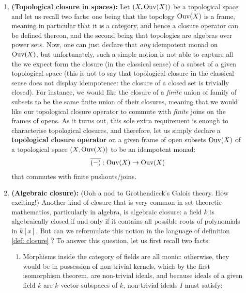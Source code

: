                     \begin{example}
                        \noindent
                        \begin{enumerate}
                            \item \textbf{(Topological closure in spaces):} Let $(X, \mathrm{Ouv}(X))$ be a topological space and let us recall two facts: one being that the topology $\mathrm{Ouv}(X)$ is a frame, meaning in particular that it is a category, and hence a closure operator can be defined thereon, and the second being that topologies are algebras over power sets. Now, one can just declare that \textit{any} idempotent monad on $\mathrm{Ouv}(X)$, but unfortunately, such a simple notion is not able to capture all the we expect form the closure (in the classical sense) of a subset of a given topological space (this is not to say that topological closure in the classical sense does not display idempotence: the closure of a closed set is trivially closed). For instance, we would like the closure of a \textit{finite} union of family of subsets to be the same finite union of their closures, meaning that we would like our topological closure operator to commute with \textit{finite} joins on the frames of opens. As it turns out, this sole extra requirement is enough to characterise topological closures, and therefore, let us simply declare a \textbf{topological closure operator} on a given frame of open subsets $\mathrm{Ouv}(X)$ of a topological space $(X, \mathrm{Ouv}(X))$ to be an idempotent monad:
                                $$\overline{(-)}: \mathrm{Ouv}(X) \to \mathrm{Ouv}(X)$$
                            that commutes with finite pushouts/joins. 
                            \item \textbf{(Algebraic closure):} (Ooh a nod to Grothendieck's Galois theory. How exciting!) Another kind of closure that is very common in set-theoretic mathematics, particularly in algebra, is algebraic closure: a field $k$ is algebraically closed if and only if it contains all possible roots of polynomials in $k[x]$. But can we reformulate this notion in the language of definition \ref{def: closure} ? To answer this question, let us first recall two facts:
                                \begin{enumerate}
                                    \item Morphisms inside the category of fields are all monic: otherwise, they would be in possession of non-trivial kernels, which by the first isomorphism theorem, are non-trivial ideals, and because ideals of a given field $k$ are $k$-vector subspaces of $k$, non-trivial ideals $I$ must satisfy:

\end{enumerate}
\end{enumerate}
\end{example}
